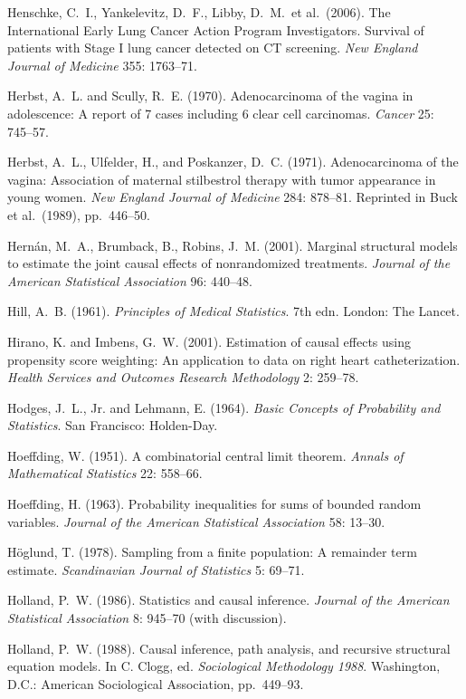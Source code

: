 \smallskip\noindent
Henschke, C.~I., Yankelevitz, D.~F., Libby, D.~M.~et al.~(2006).
The International Early Lung Cancer Action Program Investigators.
Survival of patients with Stage I lung cancer detected on CT screening.
{\it New England Journal of Medicine\/} 355: 1763--71.

\smallskip\noindent
Herbst, A.~L. and Scully, R.~E. (1970).
Adenocarcinoma of the vagina in adolescence:
A report of 7 cases including 6 clear cell carcinomas.
{\it Cancer\/} 25: 745--57.

\smallskip\noindent
Herbst, A.~L., Ulfelder, H., and Poskanzer, D.~C. (1971).
Adenocarcinoma of the vagina: Association of maternal stilbestrol therapy with tumor appearance in young women.
{\it New England Journal of Medicine\/} 284: 878--81.
Reprinted in Buck et al.~(1989), pp.~446--50.

\smallskip\noindent
Hern\'an, M.~A., Brumback, B., Robins, J.~M. (2001).
Marginal structural models to estimate the joint causal effects of nonrandomized treatments.
{\it Journal of the American Statistical Association\/} 96: 440--48.

\smallskip\noindent
Hill, A.~B. (1961).
{\it Principles of Medical Statistics\/}. 7th edn.
London: The Lancet.

\smallskip\noindent
Hirano, K. and Imbens, G.~W. (2001).
Estimation of causal effects using propensity score weighting:
An application to data on right heart catheterization.
{\it Health Services and Outcomes Research Methodology\/} 2: 259--78.

\smallskip\noindent
Hodges, J.~L., Jr. and Lehmann, E. (1964).
{\it Basic Concepts of Probability and Statistics\/}.
San Francisco: Holden-Day.

\smallskip\noindent
Hoeffding, W. (1951).
A combinatorial central limit theorem.
{\it Annals of Mathematical Statistics\/} 22: 558--66.

\smallskip\noindent
Hoeffding, H. (1963).
Probability inequalities for sums of bounded random variables.
{\it Journal of the American Statistical Association\/} 58: 13--30.

\smallskip\noindent
H\"oglund, T. (1978).
Sampling from a finite population: A remainder term estimate.
{\it Scandinavian Journal of Statistics\/} 5: 69--71.

\smallskip\noindent
Holland, P.~W. (1986).
Statistics and causal inference.
{\it Journal of the American Statistical Association\/} 8: 945--70 (with discussion).

\smallskip\noindent
Holland, P.~W. (1988).
Causal inference, path analysis, and recursive structural equation models.
In C. Clogg, ed. {\it Sociological Methodology 1988\/}.
Washington, D.C.: American Sociological Association, pp.~449--93.

